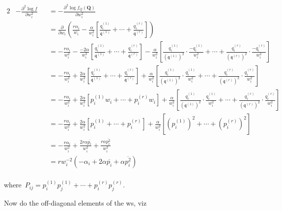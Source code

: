 \documentclass[nojss]{jss}
\begin{document}
\begin{alignat}{2}
& -\frac{\partial^2\log f}{\partial w_i^2}&&= -\frac{\partial^2\log f_Q(\mathbf{Q}) }{\partial w_i^2}\\
  & && =
  \frac{\partial}{\partial w_i}
  \left(
  \frac{r\alpha_i}{w_i} - \frac{\alpha}{w_i^2}\left[
  \frac{q_i^{(1)}}{\mathfrak{q}^{(1)}}
    +\cdots+
      \frac{q_i^{(r)}}{\mathfrak{q}^{(r)}}\right]
  \right)  \\
  &  &&=-\frac{r\alpha_i}{w_i^2} 
  -\frac{-2\alpha}{w_i^3}\left[
  \frac{q_i^{(1)}}{\mathfrak{q}^{(1)}}
    +\cdots+
    \frac{q_i^{(r)}}{\mathfrak{q}^{(r)}}\right]
  -\frac{\alpha}{w_i^2}
  \left[ 
    \frac{q_i^{(1)}}{\left(\mathfrak{q}^{(1)}\right)^2}\cdot\frac{-q_i^{(1)}}{w_i^2}
    +\cdots+ 
    \frac{q_i^{(r)}}{\left(\mathfrak{q}^{(r)}\right)^2}\cdot\frac{-q_i^{(r)}}{w_i^2}
    \right]\\
    &  &&=-\frac{r\alpha_i}{w_i^2}   +\frac{2\alpha}{w_i^3}\left[
  \frac{q_i^{(1)}}{\mathfrak{q}^{(1)}}
    +\cdots+
    \frac{q_i^{(r)}}{\mathfrak{q}^{(r)}}\right]
  +\frac{\alpha}{w_i^2}
  \left[ 
    \frac{q_i^{(1)}}{\left(\mathfrak{q}^{(1)}\right)^2}\cdot\frac{q_i^{(1)}}{w_i^2}
    +\cdots+ 
    \frac{q_i^{(r)}}{\left(\mathfrak{q}^{(r)}\right)^2}\cdot\frac{q_i^{(r)}}{w_i^2}
    \right]\\
      &  &&= -\frac{r\alpha_i}{w_i^2}   +\frac{2\alpha}{w_i^3}\left[
  p_i^{(1)} w_i +\cdots+ p_i^{(r)}w_i\right]
  +\frac{\alpha}{w_i^2}
  \left[ 
    \frac{q_i^{(1)}}{\left(\mathfrak{q}^{(1)}\right)^2}\cdot\frac{q_i^{(1)}}{w_i^2}
    +\cdots+ 
    \frac{q_i^{(r)}}{\left(\mathfrak{q}^{(r)}\right)^2}\cdot\frac{q_i^{(r)}}{w_i^2}
    \right]\\
      &  &&= -\frac{r\alpha_i}{w_i^2}   +\frac{2\alpha}{w_i^2}\left[
  p_i^{(1)} +\cdots+ p_i^{(r)}\right]
  +\frac{\alpha}{w_i^2}
  \left[ 
    \left(p_i^{(1)}\right)^2
    +\cdots+ 
    \left(p_i^{(r)}\right)^2
    \right]\\
        & && = -\frac{r\alpha_i}{w_i^2}  +\frac{2r\alpha\overline{p_i}}{w_i^2}  +\frac{r\alpha\overline{p_i^2}}{w_i^2}\\
        & && = rw_i^{-2}\left(-\alpha_i+2\alpha\overline{p_i} +\alpha\overline{p_i^2}\right)\\
\end{alignat}


where~$P_{ij}=p_i^{(1)}p_j^{(1)}+\cdots+p_i^{(r)}p_j^{(r)}$.

Now do the off-diagonal elements of the ws, viz
\end{document}

